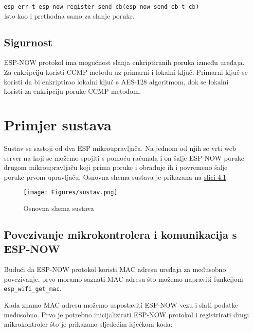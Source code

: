 \documentclass[seminarskirad]{fer}
\begin{document}
\verb|esp_err_t esp_now_register_send_cb(esp_now_send_cb_t cb)| \\
Isto kao i prethodna samo za slanje poruke.

\section{Sigurnost}

ESP-NOW protokol ima mogućnost slanja enkriptiranih poruka između uređaja. Za enkripciju koristi CCMP metodu uz primarni i lokalni ključ. Primarni ključ se koristi da bi enkriptirao lokalni ključ s AES-128 algoritmom, dok se lokalni koristi za enkripciju poruke CCMP metodom. 

\chapter{Primjer sustava}
\label{pog:primjer_sustava}

Sustav se sastoji od dva ESP mikroupravljača. Na jednom od njih se vrti web server na koji se možemo spojiti s pomoću računala i on šalje ESP-NOW poruke drugom mikroupravljaču koji prima poruke i obrađuje ih i povremeno šalje poruke prvom upravljaču. Osnovna shema sustava je prikazana na \hyperref[slk:prvaslika]{slici 4.1}


\begin{figure}[h!]
  \centering
  \texttt{[image: Figures/sustav.png]} 
  \caption{Osnovna shema sustava}
  \label{slk:prvaslika}
\end{figure}

\section{Povezivanje mikrokontrolera i komunikacija s ESP-NOW}

Budući da ESP-NOW protokol koristi MAC adresu uređaja za međusobno povezivanje, prvo moramo saznati MAC adresu što možemo napraviti funkcijom \verb|esp_wifi_get_mac|.

Kada znamo MAC adresu možemo uspostaviti ESP-NOW vezu i slati podatke međusobno. Prvo je potrebno inicijalizirati ESP-NOW protokol i registrirati drugi mikrokontroler što je prikazano sljedećim isječkom koda:
\end{document}
